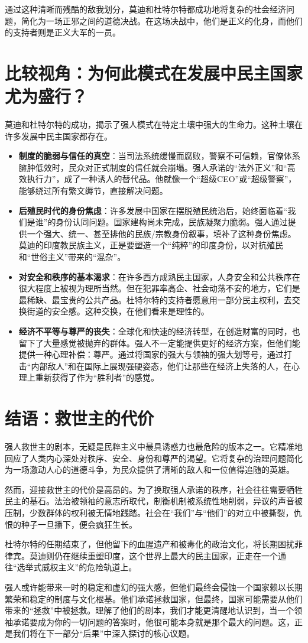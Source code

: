 通过这种清晰而残酷的敌我划分，莫迪和杜特尔特都成功地将复杂的社会经济问题，简化为一场正邪之间的道德决战。在这场决战中，他们是正义的化身，而他们的支持者则是正义大军的一员。

\section{比较视角：为何此模式在发展中民主国家尤为盛行？}
莫迪和杜特尔特的成功，揭示了强人模式在特定土壤中强大的生命力。这种土壤在许多发展中民主国家都存在。
\begin{itemize}
\item \textbf{制度的脆弱与信任的真空}：当司法系统缓慢而腐败，警察不可信赖，官僚体系臃肿低效时，民众对正式制度的信任就会崩塌。强人承诺的``法外正义''和``高效执行力''，成了一种诱人的替代品。他就像一个``超级CEO''或``超级警察''，能够绕过所有繁文缛节，直接解决问题。
\item \textbf{后殖民时代的身份焦虑}：许多发展中国家在摆脱殖民统治后，始终面临着``我们是谁''的身份认同问题。国家建构尚未完成，民族凝聚力脆弱。强人通过提供一个强大、统一、甚至排他的民族/宗教身份叙事，填补了这种身份焦虑。莫迪的印度教民族主义，正是要塑造一个``纯粹''的印度身份，以对抗殖民和``世俗主义''带来的``混杂''。
\item \textbf{对安全和秩序的基本渴求}：在许多西方成熟民主国家，人身安全和公共秩序在很大程度上被视为理所当然。但在犯罪率高企、社会动荡不安的地方，它们是最稀缺、最宝贵的公共产品。杜特尔特的支持者愿意用一部分民主权利，去交换街道的安全感。这种交换，在他们看来是理性的。
\item \textbf{经济不平等与尊严的丧失}：全球化和快速的经济转型，在创造财富的同时，也留下了大量感觉被抛弃的群体。强人不一定能提供更好的经济方案，但他们能提供一种心理补偿：尊严。通过将国家的强大与领袖的强大划等号，通过打击``内部敌人''和在国际上展现强硬姿态，他们让那些在经济上失落的人，在心理上重新获得了作为``胜利者''的感觉。
\end{itemize}

\section{结语：救世主的代价}
强人救世主的剧本，无疑是民粹主义中最具诱惑力也最危险的版本之一。它精准地回应了人类内心深处对秩序、安全、身份和尊严的渴望。它将复杂的治理问题简化为一场激动人心的道德斗争，为民众提供了清晰的敌人和一位值得追随的英雄。

然而，迎接救世主的代价是高昂的。为了换取强人承诺的秩序，社会往往需要牺牲民主的基石。法治被领袖的意志所取代，制衡机制被系统性地削弱，异议的声音被压制，少数群体的权利被无情地践踏。社会在``我们''与``他们''的对立中被撕裂，仇恨的种子一旦播下，便会疯狂生长。

杜特尔特的任期结束了，但他留下的血腥遗产和被毒化的政治文化，将长期困扰菲律宾。莫迪则仍在继续重塑印度，这个世界上最大的民主国家，正走在一个通往``选举式威权主义''的危险轨道上。

强人或许能带来一时的稳定和虚幻的强大感，但他们最终会侵蚀一个国家赖以长期繁荣和稳定的制度与文化根基。他们承诺拯救国家，但最终，国家可能需要从他们带来的``拯救''中被拯救。理解了他们的剧本，我们才能更清醒地认识到，当一个领袖承诺要成为你的一切问题的答案时，他很可能本身就是那个最大的问题。这，正是我们将在下一部分``后果''中深入探讨的核心议题。